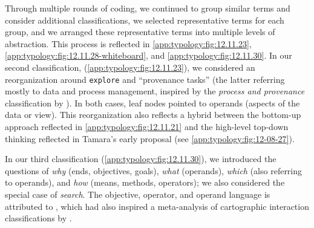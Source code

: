 Through multiple rounds of coding, we continued to group similar terms and consider additional classifications, we selected representative terms for each group, and we arranged these representative terms into multiple levels of abstraction. 
This process is reflected in \autoref{app:typology:fig:12.11.23}, \autoref{app:typology:fig:12.11.28-whiteboard}, and \autoref{app:typology:fig:12.11.30}.
In our second classification, (\autoref{app:typology:fig:12.11.23}), we considered an reorganization around {\tt explore} and ``provenance tasks'' (the latter referring mostly to data and process management, inspired by the {\it process and provenance} classification by \citet{Heer2012}).
In both cases, leaf nodes pointed to operands (aspects of the data or view).
This reorganization also reflects a hybrid between the bottom-up approach reflected in \autoref{app:typology:fig:12.11.21} and the high-level top-down thinking reflected in Tamara's early proposal (see \autoref{app:typology:fig:12-08-27}).

In our third classification (\autoref{app:typology:fig:12.11.30}), we introduced the questions of {\it why} (ends, objectives, goals), {\it what} (operands), {\it which} (also referring to operands), and {\it how} (means, methods, operators); we also considered the special case of {\it search}.
The objective, operator, and operand language is attributed to \citet{Norman1988}, which had also inspired a meta-analysis of cartographic interaction classifications by \citet{Roth2012a}.


